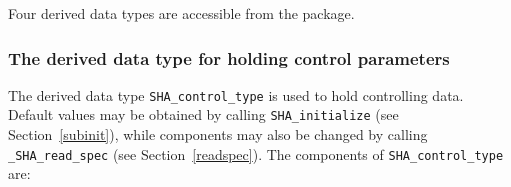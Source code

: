 \documentclass{galahad}
\newcommand{\packagename}{SHA}
\newcommand{\fullpackagename}{\libraryname\_\packagename}
\begin{document}







\galtypes
Four derived data types are accessible from the package.


\subsubsection{The derived data type for holding control
 parameters}\label{typecontrol}
The derived data type
{\tt \packagename\_control\_type}
is used to hold controlling data. Default values may be obtained by calling
{\tt \packagename\_initialize}
(see Section~\ref{subinit}),
while components may also be changed by calling
{\tt \fullpackagename\_read\-\_spec}
(see Section~\ref{readspec}).
The components of
{\tt \packagename\_control\_type}
are:
\end{document}
